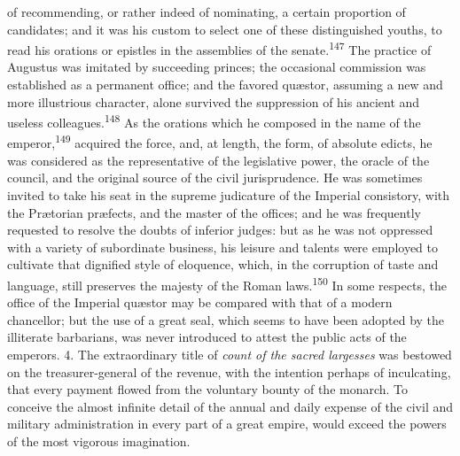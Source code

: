 of recommending, or rather indeed of nominating, a certain
proportion of candidates; and it was his custom to select one of
these distinguished youths, to read his orations or epistles in
the assemblies of the senate.\textsuperscript{147} The practice of Augustus was
imitated by succeeding princes; the occasional commission was
established as a permanent office; and the favored quæstor,
assuming a new and more illustrious character, alone survived the
suppression of his ancient and useless colleagues.\textsuperscript{148} As the
orations which he composed in the name of the emperor,\textsuperscript{149}
acquired the force, and, at length, the form, of absolute edicts,
he was considered as the representative of the legislative power,
the oracle of the council, and the original source of the civil
jurisprudence. He was sometimes invited to take his seat in the
supreme judicature of the Imperial consistory, with the Prætorian
præfects, and the master of the offices; and he was frequently
requested to resolve the doubts of inferior judges: but as he was
not oppressed with a variety of subordinate business, his leisure
and talents were employed to cultivate that dignified style of
eloquence, which, in the corruption of taste and language, still
preserves the majesty of the Roman laws.\textsuperscript{150} In some respects,
the office of the Imperial quæstor may be compared with that of a
modern chancellor; but the use of a great seal, which seems to
have been adopted by the illiterate barbarians, was never
introduced to attest the public acts of the emperors. 4. The
extraordinary title of \textit{count of the sacred largesses} was
bestowed on the treasurer-general of the revenue, with the
intention perhaps of inculcating, that every payment flowed from
the voluntary bounty of the monarch. To conceive the almost
infinite detail of the annual and daily expense of the civil and
military administration in every part of a great empire, would
exceed the powers of the most vigorous imagination.

